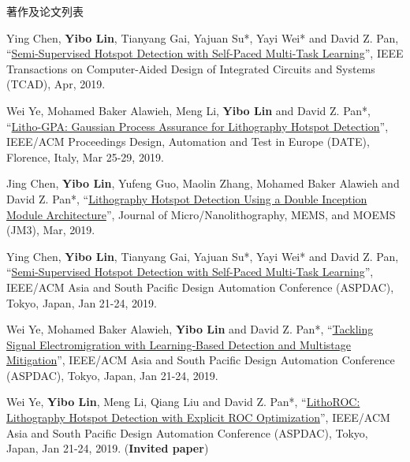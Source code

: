 \begin{rSection}{著作及论文列表}
\begin{description}[font=\normalfont, rightmargin=2em]
\item[{[J36]}]{
        Ying Chen, \textbf{Yibo Lin}, Tianyang Gai, Yajuan Su*, Yayi Wei* and David Z. Pan, 
    ``\href{https://doi.org/10.1109/TCAD.2019.2912948}{Semi-Supervised Hotspot Detection with Self-Paced Multi-Task Learning}'', 
    IEEE Transactions on Computer-Aided Design of Integrated Circuits and Systems (TCAD), Apr, 2019.
    
}
            

\item[{[C35]}]{
        Wei Ye, Mohamed Baker Alawieh, Meng Li, \textbf{Yibo Lin} and David Z. Pan*, 
    ``\href{https://doi.org/10.23919/DATE.2019.8714960}{Litho-GPA: Gaussian Process Assurance for Lithography Hotspot Detection}'', 
    IEEE/ACM Proceedings Design, Automation and Test in Europe (DATE), Florence, Italy, Mar 25-29, 2019.
    
}
            

\item[{[J34]}]{
        Jing Chen, \textbf{Yibo Lin}, Yufeng Guo, Maolin Zhang, Mohamed Baker Alawieh and David Z. Pan*, 
    ``\href{https://doi.org/10.1117/1.JMM.18.1.013507}{Lithography Hotspot Detection Using a Double Inception Module Architecture}'', 
    Journal of Micro/Nanolithography, MEMS, and MOEMS (JM3), Mar, 2019.
    
}
            

\item[{[C33]}]{
        Ying Chen, \textbf{Yibo Lin}, Tianyang Gai, Yajuan Su*, Yayi Wei* and David Z. Pan, 
    ``\href{https://doi.org/10.1145/3287624.3287685}{Semi-Supervised Hotspot Detection with Self-Paced Multi-Task Learning}'', 
    IEEE/ACM Asia and South Pacific Design Automation Conference (ASPDAC), Tokyo, Japan, Jan 21-24, 2019.
    
}
            

\item[{[C32]}]{
        Wei Ye, Mohamed Baker Alawieh, \textbf{Yibo Lin} and David Z. Pan*, 
    ``\href{https://doi.org/10.1145/3287624.3287688}{Tackling Signal Electromigration with Learning-Based Detection and Multistage Mitigation}'', 
    IEEE/ACM Asia and South Pacific Design Automation Conference (ASPDAC), Tokyo, Japan, Jan 21-24, 2019.
    
}
            

\item[{[C31]}]{
        Wei Ye, \textbf{Yibo Lin}, Meng Li, Qiang Liu and David Z. Pan*, 
    ``\href{https://doi.org/10.1145/3287624.3288746}{LithoROC: Lithography Hotspot Detection with Explicit ROC Optimization}'', 
    IEEE/ACM Asia and South Pacific Design Automation Conference (ASPDAC), Tokyo, Japan, Jan 21-24, 2019.
    (\textbf{Invited paper})
}
            


\end{description}
\end{rSection}
